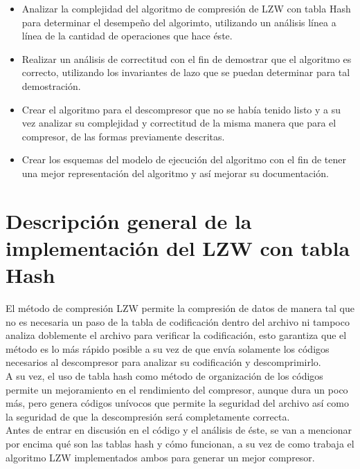 \documentclass[letterpaper]{article}
\begin{document}
\begin{itemize}

\item Analizar la complejidad del algoritmo de compresión de LZW con tabla Hash para determinar el desempeño del algorimto, utilizando un análisis línea a línea de la cantidad de operaciones que hace éste.
\item Realizar un análisis de correctitud con el fin de demostrar que el algoritmo es correcto, utilizando los invariantes de lazo que se puedan determinar para tal demostración.
\item Crear el algoritmo para el descompresor que no se había tenido listo y a su vez analizar su complejidad y correctitud de la misma manera que para el compresor, de las formas previamente descritas.
\item Crear los esquemas del modelo de ejecución del algoritmo con el fin de tener una mejor representación del algoritmo y así mejorar su documentación.\\

\end{itemize}


\section{Descripción general de la implementación del LZW con tabla Hash}

El método de compresión LZW permite la compresión de datos de manera tal que no es necesaria un paso de la tabla de codificación dentro del archivo ni tampoco analiza doblemente el archivo para verificar la codificación, esto garantiza que el método es lo más rápido posible a su vez de que envía solamente los códigos necesarios al descompresor para analizar su codificación y descomprimirlo.\\

A su vez, el uso de tabla hash como método de organización de los códigos permite un mejoramiento en el rendimiento del compresor, aunque dura un poco más, pero genera códigos unívocos que permite la seguridad del archivo así como la seguridad de que la descompresión será completamente correcta.\\

Antes de entrar en discusión en el código y el análisis de éste, se van a mencionar por encima qué son las tablas hash y cómo funcionan, a su vez de como trabaja el algoritmo LZW implementados ambos para generar un mejor compresor.\\
\end{document}
